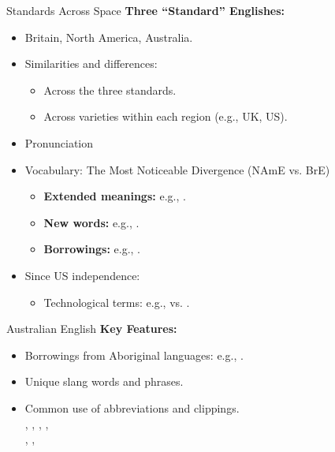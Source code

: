 \documentclass{beamer}
\begin{document}
\begin{frame}{Standards Across Space}
\textbf{Three ``Standard'' Englishes:}
\begin{itemize}
    \item Britain, North America, Australia.
    \item Similarities and differences:
    \begin{itemize}
        \item Across the three standards.
        \item Across varieties within each region (e.g., UK, US).
        \end{itemize}
      \item Pronunciation
    \item Vocabulary: The Most Noticeable Divergence (NAmE vs. BrE)
    \begin{itemize}
        \item \textbf{Extended meanings:} e.g., .
        \item \textbf{New words:} e.g., .
        \item \textbf{Borrowings:} e.g., .
    \end{itemize}
    \item Since US independence:
    \begin{itemize}
        \item Technological terms: e.g.,  vs. .
    \end{itemize}
\end{itemize}
\end{frame}


\begin{frame}{Australian English}
\textbf{Key Features:}
\begin{itemize}
    \item Borrowings from Aboriginal languages: e.g., .
    \item Unique slang words and phrases.
    \item Common use of abbreviations and clippings.
      \\ , , , , 
      \\ , , 
\end{itemize}
\end{frame}
\end{document}
